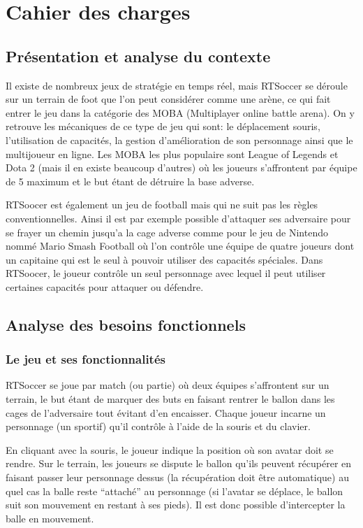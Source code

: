 \chapter{Cahier des charges}


\section{Présentation et analyse du contexte}

Il existe de nombreux jeux de stratégie en temps réel, mais RTSoccer se déroule sur un terrain de foot que l’on peut considérer comme une arène, ce qui fait entrer le jeu dans la catégorie des MOBA (Multiplayer online battle arena). On y retrouve les mécaniques de ce type de jeu qui sont: le déplacement souris, l’utilisation de capacités, la gestion d’amélioration de son personnage ainsi que le multijoueur en ligne. Les MOBA les plus populaire sont League of Legends et Dota 2 (mais il en existe beaucoup d’autres) où les joueurs s’affrontent par équipe de 5 maximum et le but étant de détruire la base adverse.

RTSoocer est également un jeu de football mais qui ne suit pas les règles conventionnelles. Ainsi il est par exemple possible d’attaquer ses adversaire pour se frayer un chemin jusqu’a la cage adverse comme pour le jeu de Nintendo nommé Mario Smash Football où l’on contrôle une équipe de quatre joueurs dont un capitaine qui est le seul à pouvoir utiliser des capacités spéciales. Dans RTSoocer, le joueur contrôle un seul personnage avec lequel il peut utiliser certaines capacités pour attaquer ou défendre.

\section{Analyse des besoins fonctionnels}


\subsection{Le jeu et ses fonctionnalités}

RTSoccer se joue par match (ou partie) où deux équipes s’affrontent sur un terrain, le but étant de marquer des buts en faisant rentrer le ballon dans les cages de l’adversaire tout évitant d’en encaisser.
Chaque joueur incarne un personnage (un sportif) qu’il contrôle à l’aide de la souris et du clavier.

En cliquant avec la souris, le joueur indique la position où son avatar doit se rendre. Sur le terrain, les joueurs se dispute le ballon qu’ils peuvent récupérer en faisant passer leur personnage dessus (la récupération doit être automatique) au quel cas la balle reste “attaché” au personnage (si l’avatar se déplace, le ballon suit son mouvement en restant à ses pieds). Il est donc possible d’intercepter la balle en mouvement.

